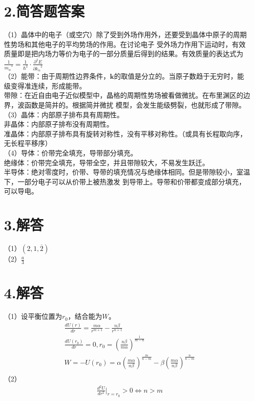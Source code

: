 \documentclass[UTF8]{ctexart}
\begin{document}
\section*{\bfseries 2.简答题答案}
（1）晶体中的电子（或空穴）除了受到外场作用外，还要受到晶体中原子的周期性势场和其他电子的平均势场的作用。在讨论电子
受外场力作用下运动时，有效质量即是把内场力等价为电子的一部分质量后得到的结果。有效质量的表达式为
$\frac{1}{{m_\alpha}^{*}}=\frac{1}{\hbar^2}\cdot\frac{\partial^2E}{{\partial k_\alpha}^2}$\\
（2）能带：由于周期性边界条件，$\bm{k}$的取值是分立的。当原子数趋于无穷时，能级变得准连续，形成能带。\\
带隙：在近自由电子近似模型中，晶格的周期性势场被看做微扰。在布里渊区的边界，波函数是简并的。根据简并微扰
模型，会发生能级劈裂，也就形成了带隙。\\
（3）晶体：内部原子排布具有周期性。\\
非晶体：内部原子排布没有周期性。\\
准晶体：内部原子排布具有旋转对称性，没有平移对称性。（或具有长程取向序，无长程平移序）\\
（4）导体：价带完全填充，导带部分填充。\\
绝缘体：价带完全填充，导带全空，并且带隙较大，不易发生跃迁。\\
半导体：绝对零度时，价带、导带的填充情况与绝缘体相同。但是带隙较小，室温下，一部分电子可以从价带上被热激发
到导带上。导带和价带都变成部分填充，可以导电。\\
\section*{\bfseries 3.解答}
（1）$(2,1,\overline{2})$\\
（2）$\frac{a}{3}$\\
\section*{\bfseries 4.解答}
（1）设平衡位置为$r_0$，结合能为$W$。
\begin{equation*}
    \begin{aligned}
        & \frac{dU(r)}{dr}=\frac{m\alpha}{r^{m+1}}-\frac{n\beta}{r^{n+1}}\\
        & \frac{dU(r_0)}{dr}=0,r_0=(\frac{n\beta}{m\alpha})^{\frac{1}{m-n}}\\
        & W=-U(r_0)=\alpha(\frac{m\alpha}{n\beta})^{\frac{m}{n-m}}-\beta(\frac{m\alpha}{n\beta})^{\frac{n}{n-m}}\\
    \end{aligned}
\end{equation*}
（2）
\begin{equation*}
    \begin{aligned}
        & \frac{d^2U}{dr^2}\lvert_{r=r_0}>0 \iff n>m
    \end{aligned}
\end{equation*}
\end{document}
